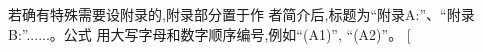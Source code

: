 \documentclass[10.5pt,twocolumn]{jbuaa}
\begin{document}
  
 若确有特殊需要设附录的,附录部分置于作
 者简介后,标题为“附录A:”、“附录B:”......。公式
 用大写字母和数字顺序编号,例如“(A1)”, “(A2)”。
 \clearpage
 \newpage
 \pagestyle{fancy}
 \fancyhf{}
 \lhead{}
 \rhead{}
 \lfoot{}
 \cfoot{}
 \rfoot{}
 \renewcommand{\headrule}{%
 \hrule height0.4pt width \headwidth \vskip1.0pt%
 \hrule height0.4pt width \headwidth \vskip-2pt}
 \twocolumn[
\end{document}
